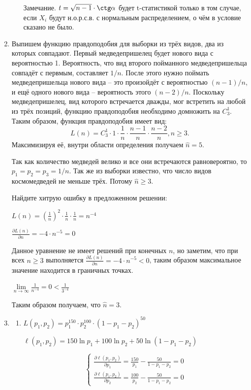 \begin{enumerate}
\begin{enumerate}
Замечание. $t=\sqrt{n-1}\cdot \ctg \alpha$ будет t-статистикой только в том случае, если $X_i$ будут н.о.р.с.в. с нормальным распределением, о чём в условие сказано не было.
\end{enumerate}
\item Выпишем функцию правдоподобия для выборки из трёх видов, два из которых совпадают. Первый медведепришелец будет нового вида с вероятностью 1. Вероятность, что вид второго пойманного медведепришельца совпадёт с первмым, составляет $1/n$. После этого нужно поймать медведепришельца нового вида – это произойдёт с вероятностью $(n-1)/n$, и ещё одного нового вида – вероятность этого $(n-2)/n$. Поскольку медведепришелец, вид которого встречается дважды, мог встретить на любой из трёх позиций, функцию правдоподобия необходимо домножить на $C_3^1$. Таким образом, функция правдоподобия имеет вид:
\[
L(n) = C_3^1 \cdot 1 \cdot \frac{1}{n} \cdot \frac{n-1}{n} \cdot \frac{n-2}{n}, n \geq 3.
\]
Максимизируя её, внутри области определения получаем $\hat n = 5$.

Так как количество медведей велико и все они встречаются равновероятно, то $p_{1}=p_{2}=p_{3}=1/n$. Так же из выборки известно, что число видов космомедведей не меньше трёх. Потому $\hat{n} \ge 3$.

Найдите хитрую ошибку в предложенном решении:

$L(n)=\left(\frac{1}{n}\right)^{2} \cdot \frac{1}{n}\cdot\frac{1}{n}=n^{-4}$

$\frac{\partial L(n)}{\partial n} = -4\cdot n^{-5}=0$

Данное уравнение не имеет решений при конечных $n$, но заметим, что при всех $n \ge 3$ выполняется $\frac{\partial L(n)}{\partial n} = -4\cdot n^{-5} < 0$, таким образом максимальное значение находится в граничных точках.

$\lim\limits_{n\to\infty}\frac{1}{n^{-4}}=0 < \frac{1}{3^{-4}}$

Таким образом получаем, что $\hat{n}=3$.

\item \begin{enumerate}
\item $L(p_{1},p_{2})=p_{1}^{150}\cdot p_{2}^{100}\cdot(1-p_{1}-p_{2})^{50}$

$\ell(p_{1},p_{2}) = 150\ln p_{1} +100\ln p_{2}+50\ln (1-p_{1}-p_{2})$

\[
\begin{cases}
\frac{\partial \ell(p_{1},p_{2})}{\partial p_{1}}= \frac{150}{p_{1}} - \frac{50}{1-p_{1}-p_{2}}=0 \\
\frac{\partial \ell(p_{1},p_{2})}{\partial p_{2}}= \frac{100}{p_{2}} - \frac{50}{1-p_{1}-p_{2}}=0
\end{cases}
\]


\end{enumerate}
\end{enumerate}
